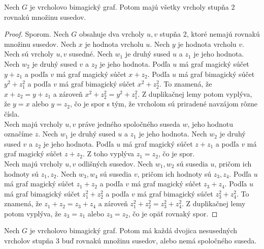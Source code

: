 \begin{theorem}
\label{vbgdegree2}
Nech $G$ je vrcholovo bimagický graf. Potom majú všetky vrcholy stupňa 2 rovnakú množinu susedov.
\end{theorem}

\begin{proof} Sporom. Nech $G$ obsahuje dva vrcholy $u,v$ stupňa 2, ktoré nemajú rovnakú množinu susedov. Nech $x$ je hodnota vrcholu $u$. Nech $y$ je hodnota vrcholu $v$. \\

Nech sú vrcholy $u,v$ susedné. Nech $w_1$ je druhý sused $u$ a $z_1$ je jeho hodnota. Nech $w_2$ je druhý sused $v$ a $z_2$ je jeho hodnota. Podľa $u$ má graf magický súčet $y + z_1$ a podľa $v$ má graf magický súčet $x + z_2$. Podľa $u$ má graf bimagický súčet $y^2 + z^2_1$ a podľa $v$ má graf bimagický súčet $x^2 + z^2_2$.  To znamená, že $x + z_2 = y + z_1$ a zároveň $x^2 + z^2_2 = y^2 + z^2_1$. Z duplikačnej lemy potom vyplýva, že $y = x$ alebo $y = z_2$, čo je spor s tým, že vrcholom sú priradené navzájom rôzne čísla. \\

Nech majú vrcholy $u,v$ práve jedného spoločného suseda $w$, jeho hodnotu označíme $z$. Nech $w_1$ je druhý sused $u$ a $z_1$ je jeho hodnota. Nech $w_2$ je druhý sused $v$ a $z_2$ je jeho hodnota. Podľa $u$ má graf magický súčet $z + z_1$ a podľa $v$ má graf magický súčet $z + z_2$. Z toho vyplýva $z_1 = z_2$, čo je spor. \\

Nech majú vrcholy $u,v$ odlišných susedov. Nech $w_1, w_2$ sú susedia $u$, pričom ich hodnoty sú $z_1, z_2$. Nech $w_3, w_4$ sú susedia $v$, pričom ich hodnoty sú $z_3, z_4$. Podľa $u$ má graf magický súčet $z_1 + z_2$ a podľa $v$ má graf magický súčet $z_3 + z_4$. Podľa $u$ má graf bimagický súčet $z^2_1 + z^2_2$ a podľa $v$ má graf bimagický súčet $z^2_3 + z^2_4$. To znamená, že $z_1 + z_2 = z_3 + z_4$ a zároveň $z^2_1 + z^2_2 = z^2_3 + z^2_4$. Z duplikačnej lemy potom vyplýva, že $z_3 = z_1$ alebo $z_3 = z_2$, čo je opäť rovnaký spor.
\end{proof}

\begin{theorem} 
\label{vbgdegree3}
Nech $G$ je vrcholovo bimagický graf. Potom má každá dvojica nesusedných vrcholov stupňa 3 buď rovnakú množinu susedov, alebo nemá spoločného suseda.
\end{theorem}

